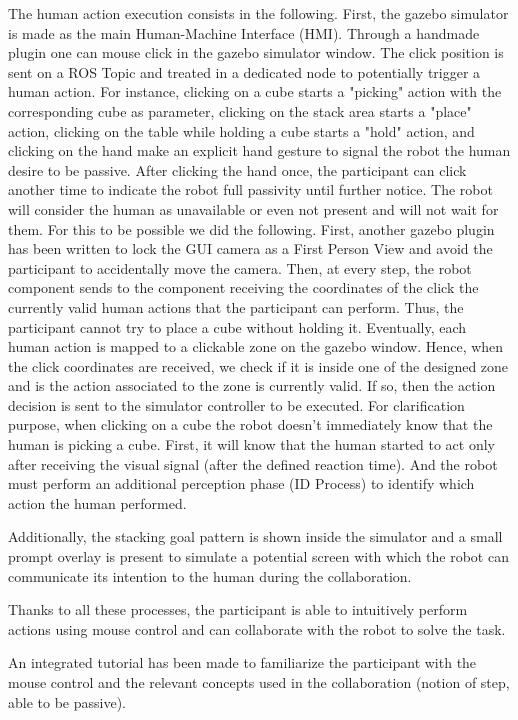 The human action execution consists in the following. First, the gazebo simulator is made as the main Human-Machine Interface (HMI). Through a handmade plugin one can mouse click in the gazebo simulator window. The click position is sent on a ROS Topic and treated in a dedicated node to potentially trigger a human action. For instance, clicking on a cube starts a "picking" action with the corresponding cube as parameter, clicking on the stack area starts a "place" action, clicking on the table while holding a cube starts a "hold" action, and clicking on the hand make an explicit hand gesture to signal the robot the human desire to be passive. After clicking the hand once, the participant can click another time to indicate the robot full passivity until further notice. The robot will consider the human as unavailable or even not present and will not wait for them. 
For this to be possible we did the following. First, another gazebo plugin has been written to lock the GUI camera as a First Person View and avoid the participant to accidentally move the camera.
Then, at every step, the robot component sends to the component receiving the coordinates of the click the currently valid human actions that the participant can perform. Thus, the participant cannot try to place a cube without holding it. Eventually, each human action is mapped to a clickable zone on the gazebo window. Hence, when the click coordinates are received, we check if it is inside one of the designed zone and is the action associated to the zone is currently valid. If so, then the action decision is sent to the simulator controller to be executed. 
For clarification purpose, when clicking on a cube the robot doesn't immediately know that the human is picking a cube. First, it will know that the human started to act only after receiving the visual signal (after the defined reaction time). And the robot must perform an additional perception phase (ID Process) to identify which action the human performed. 

Additionally, the stacking goal pattern is shown inside the simulator and a small prompt overlay is present to simulate a potential screen with which the robot can communicate its intention to the human during the collaboration. 

Thanks to all these processes, the participant is able to intuitively perform actions using mouse control and can collaborate with the robot to solve the task.

An integrated tutorial has been made to familiarize the participant with the mouse control and the relevant concepts used in the collaboration (notion of step, able to be passive). 



